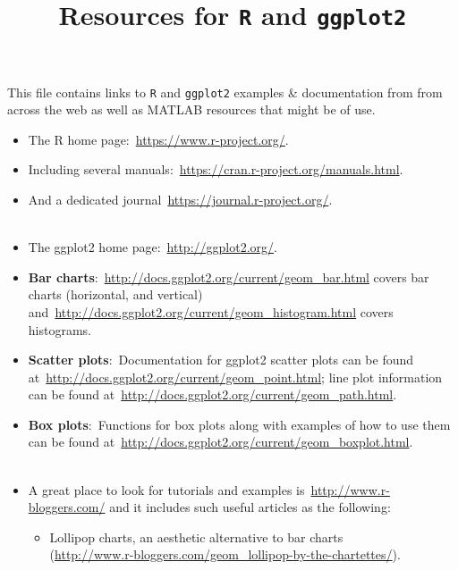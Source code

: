 \documentclass[a4paper]{article}
\title{Resources for \texttt{R} and \texttt{ggplot2}}
\begin{document}
    \maketitle
    This file contains links to \texttt{R} and \texttt{ggplot2} examples \& documentation from from across the web as well as MATLAB resources that might be of use.\\

    \begin{itemize}
        \item The R home page:\ \url{https://www.r-project.org/}.\\
        \item Including several manuals:\ \url{https://cran.r-project.org/manuals.html}.\\
        \item And a dedicated journal\ \url{https://journal.r-project.org/}.\\
        \\
        \item The ggplot2 home page:\ \url{http://ggplot2.org/}.\\
        \item \textbf{Bar charts}:~\url{http://docs.ggplot2.org/current/geom_bar.html} covers bar charts (horizontal, and vertical) and\ \url{http://docs.ggplot2.org/current/geom_histogram.html} covers histograms.\\
        \item \textbf{Scatter plots}:~Documentation for ggplot2 scatter plots can be found at\ \url{http://docs.ggplot2.org/current/geom_point.html}; line plot information can be found at\ \url{http://docs.ggplot2.org/current/geom_path.html}.\\
        \item \textbf{Box plots}:~Functions for box plots along with examples of how to use them can be found at\ \url{http://docs.ggplot2.org/current/geom_boxplot.html}.\\
        \\
        \item A great place to look for tutorials and examples is\ \url{http://www.r-bloggers.com/} and it includes such useful articles as the following:\\
        \begin{itemize}
            \item Lollipop charts, an aesthetic alternative to bar charts\\ (\url{http://www.r-bloggers.com/geom_lollipop-by-the-chartettes/}).\\

\end{itemize}
\end{itemize}
\end{document}
